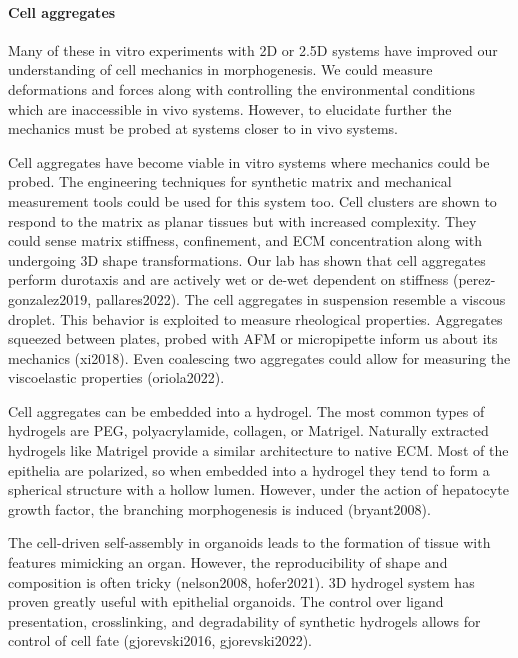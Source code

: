 \documentclass[
]{article}
\begin{document}
\hypertarget{cell-aggregates}{%
\paragraph{\texorpdfstring{Cell aggregates
}{Cell aggregates }}\label{cell-aggregates}}

Many of these in vitro experiments with 2D or 2.5D systems have improved
our understanding of cell mechanics in morphogenesis. We could measure
deformations and forces along with controlling the environmental
conditions which are inaccessible in vivo systems. However, to elucidate
further the mechanics must be probed at systems closer to in vivo
systems.

Cell aggregates have become viable in vitro systems where mechanics
could be probed. The engineering techniques for synthetic matrix and
mechanical measurement tools could be used for this system too. Cell
clusters are shown to respond to the matrix as planar tissues but with
increased complexity. They could sense matrix stiffness, confinement,
and ECM concentration along with undergoing 3D shape transformations.
Our lab has shown that cell aggregates perform durotaxis and are
actively wet or de-wet dependent on stiffness (perez-gonzalez2019,
pallares2022). The cell aggregates in suspension resemble a viscous
droplet. This behavior is exploited to measure rheological properties.
Aggregates squeezed between plates, probed with AFM or micropipette
inform us about its mechanics (xi2018). Even coalescing two aggregates
could allow for measuring the viscoelastic properties (oriola2022).

Cell aggregates can be embedded into a hydrogel. The most common types
of hydrogels are PEG, polyacrylamide, collagen, or Matrigel. Naturally
extracted hydrogels like Matrigel provide a similar architecture to
native ECM. Most of the epithelia are polarized, so when embedded into a
hydrogel they tend to form a spherical structure with a hollow lumen.
However, under the action of hepatocyte growth factor, the branching
morphogenesis is induced (bryant2008).

The cell-driven self-assembly in organoids leads to the formation of
tissue with features mimicking an organ. However, the reproducibility of
shape and composition is often tricky (nelson2008, hofer2021). 3D
hydrogel system has proven greatly useful with epithelial organoids. The
control over ligand presentation, crosslinking, and degradability of
synthetic hydrogels allows for control of cell fate (gjorevski2016,
gjorevski2022).
\end{document}
